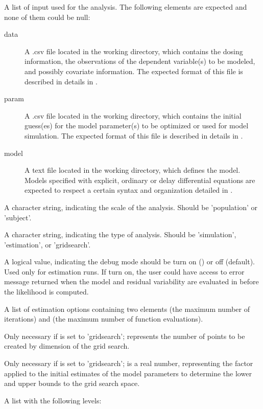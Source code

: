 \begin{Arguments}
\begin{ldescription}
\item[\code{files}] A list of input used for the analysis. The following elements are
expected and none of them could be null: \begin{description}

\item[data] A .csv file located in the working directory, which contains
the dosing information, the observations of the dependent variable(s)
to be modeled, and possibly covariate information. The expected format 
of this file is described in details in .
\item[param] A .csv file located in the working directory, which contains
the initial guess(es) for the model parameter(s) to be optimized or used
for model simulation. The expected format of this file is described in
details in .
\item[model] A text file located in the working directory, which defines 
the model. Models specified with explicit, ordinary or delay 
differential equations are expected to respect a certain syntax and 
organization detailed in .


\end{description}


\item[\code{method}] A character string, indicating the scale of the analysis. Should
be 'population' or 'subject'.
\item[\code{runtype}] A character string, indicating the type of analysis. Should be
'simulation', 'estimation', or 'gridsearch'.
\item[\code{debugmode}] A logical value, indicating the debug mode should be turn on
() or off (default). Used only for estimation runs. If turn on,
the user could have access to error message returned when the model and
residual variability are evaluated in  before the likelihood
is computed.
\item[\code{estim.options}] A list of estimation options containing two elements
 (the maximum number of iterations) and  (the
maximum number of function evaluations).
\item[\code{npts}] Only necessary if  is set to 'gridsearch';  
represents the number of points to be created by dimension of the grid 
search.
\item[\code{alpha}] Only necessary if  is set to 'gridsearch'; 
 is a real number, representing the factor applied to the 
initial estimates of the model parameters to determine the lower and upper 
bounds to the grid search space.
\item[\code{dde.options}] A list with the following levels:\begin{description}


\end{description}
\end{ldescription}
\end{Arguments}
